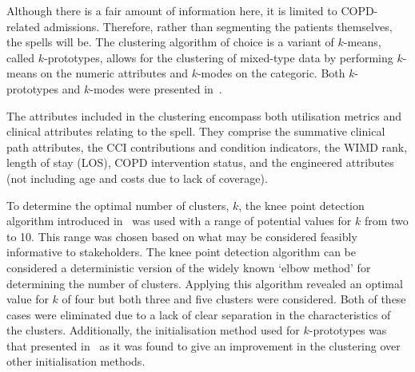 \documentclass[11pt]{article}
\begin{document}
Although there is a fair amount of information here, it is limited to
COPD-related admissions. Therefore, rather than segmenting the patients
themselves, the spells will be. The clustering algorithm of choice is a variant
of \(k\)-means, called \(k\)-prototypes, allows for the clustering of mixed-type
data by performing \(k\)- means on the numeric attributes and \(k\)-modes on the
categoric. Both \(k\)-prototypes and \(k\)-modes were presented
in~\cite{Huang1998}.

The attributes included in the clustering encompass both utilisation metrics and
clinical attributes relating to the spell. They comprise the summative clinical
path attributes, the CCI contributions and condition indicators, the WIMD rank,
length of stay (LOS), COPD intervention status, and the engineered attributes
(not including age and costs due to lack of coverage).

To determine the optimal number of clusters, \(k\), the knee point detection
algorithm introduced in~\cite{Satopaa2011} was used with a range of potential
values for \(k\) from two to 10. This range was chosen based on what may be
considered feasibly informative to stakeholders. The knee point detection
algorithm can be considered a deterministic version of the widely known `elbow
method' for determining the number of clusters. Applying this algorithm
revealed an optimal value for \(k\) of four but both three and five clusters
were considered. Both of these cases were eliminated due to a lack of clear
separation in the characteristics of the clusters. Additionally, the
initialisation method used for \(k\)-prototypes was that presented
in~\cite{Wilde2020} as it was found to give an improvement in the clustering
over other initialisation methods.
\end{document}
